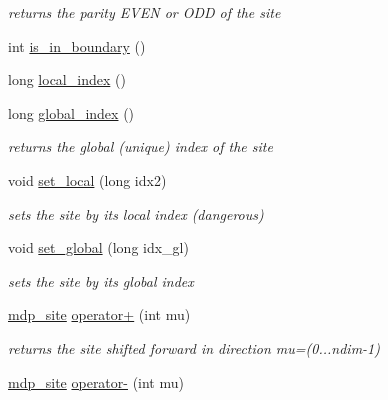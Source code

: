 \begin{CompactItemize}
\begin{CompactList}\small\item\em returns the parity EVEN or ODD of the site \item\end{CompactList}\item 
int \hyperlink{classmdp__site_57188578cccbd53d6ff5ef5b791d32a4}{is\_\-in\_\-boundary} ()
\item 
long \hyperlink{classmdp__site_17f0defd41f0bd2e6e744e8d82f8fcbe}{local\_\-index} ()
\item 
\hypertarget{classmdp__site_3f1081c21936902ad685bd2b0aa7463e}{
long \hyperlink{classmdp__site_3f1081c21936902ad685bd2b0aa7463e}{global\_\-index} ()}
\label{classmdp__site_3f1081c21936902ad685bd2b0aa7463e}

\begin{CompactList}\small\item\em returns the global (unique) index of the site \item\end{CompactList}\item 
\hypertarget{classmdp__site_636b15fb95615c02f56987fc8f971ebf}{
void \hyperlink{classmdp__site_636b15fb95615c02f56987fc8f971ebf}{set\_\-local} (long idx2)}
\label{classmdp__site_636b15fb95615c02f56987fc8f971ebf}

\begin{CompactList}\small\item\em sets the site by its local index (dangerous) \item\end{CompactList}\item 
\hypertarget{classmdp__site_c9e98bd4d2e0608e6c584d84d51038a8}{
void \hyperlink{classmdp__site_c9e98bd4d2e0608e6c584d84d51038a8}{set\_\-global} (long idx\_\-gl)}
\label{classmdp__site_c9e98bd4d2e0608e6c584d84d51038a8}

\begin{CompactList}\small\item\em sets the site by its global index \item\end{CompactList}\item 
\hypertarget{classmdp__site_86993407e982dc5dbc92cca7dfdaa536}{
\hyperlink{classmdp__site}{mdp\_\-site} \hyperlink{classmdp__site_86993407e982dc5dbc92cca7dfdaa536}{operator+} (int mu)}
\label{classmdp__site_86993407e982dc5dbc92cca7dfdaa536}

\begin{CompactList}\small\item\em returns the site shifted forward in direction mu=(0...ndim-1) \item\end{CompactList}\item 
\hypertarget{classmdp__site_3dceebe7dec6a488314064cee7ef8d80}{
\hyperlink{classmdp__site}{mdp\_\-site} \hyperlink{classmdp__site_3dceebe7dec6a488314064cee7ef8d80}{operator-} (int mu)}
\label{classmdp__site_3dceebe7dec6a488314064cee7ef8d80}


\end{CompactItemize}
